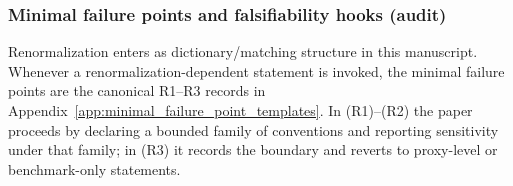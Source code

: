 \subsubsection{Minimal failure points and falsifiability hooks (audit)}
\label{subsec:renorm_minimal_failure_points}
\AuditTag Renormalization enters as dictionary/matching structure in this manuscript.
Whenever a renormalization-dependent statement is invoked, the minimal failure points are the canonical R1--R3 records in Appendix~\ref{app:minimal_failure_point_templates}.
In (R1)--(R2) the paper proceeds by declaring a bounded family of conventions and reporting sensitivity under that family; in (R3) it records the boundary and reverts to proxy-level or benchmark-only statements.
